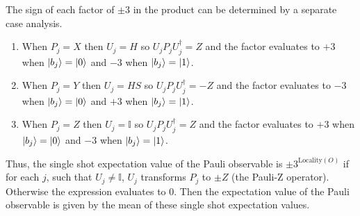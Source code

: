 \documentclass[12pt]{article}
\begin{document}
    The sign of each factor of $\pm 3$ in the product can be determined by a separate case analysis.
    \begin{enumerate}
        \item When $P_j = X$ then $U_j = H$ so $U_jP_j U^\dagger_j = Z$ and the factor evaluates to $+3$ when $\ket{b_j} = \ket{0}$ and $-3$ when $\ket{b_j} = \ket{1}$.
        \item When $P_j = Y$ then $U_j = HS$ so $U_jP_j U^\dagger_j = -Z$ and the factor evaluates to $-3$ when $\ket{b_j} = \ket{0}$ and $+3$ when $\ket{b_j} = \ket{1}$.
        \item When $P_j = Z$ then $U_j = \mathbb{I}$ so $U_jP_j U^\dagger_j = Z$ and the factor evaluates to $+3$ when $\ket{b_j} = \ket{0}$ and $-3$ when $\ket{b_j} = \ket{1}$.
    \end{enumerate}

    Thus, the single shot expectation value of the Pauli observable is $\pm3^{\text{Locality}(O)}$ if for each $j$, such that $U_j \neq \mathbb{I}$, $U_j$ transforms $P_j$ to $\pm Z$ (the Pauli-Z operator). Otherwise the expression evaluates to 0. Then the expectation value of the Pauli observable is given by the mean of these single shot expectation values.

    \printbibliography[title={References}]
\end{document}
